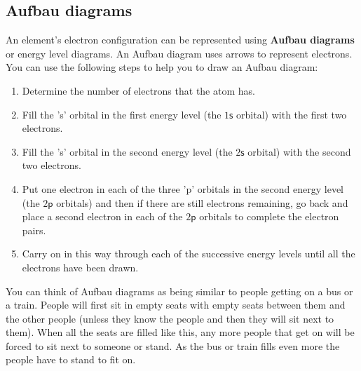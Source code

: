\subsection*{Aufbau diagrams}        
\label{m38741*id259628}An element's electron configuration can be represented using \textbf{Aufbau diagrams} or energy level diagrams. An Aufbau diagram uses arrows to represent electrons. You can use the following steps to help you to draw an Aufbau diagram:\par 
        \label{m38741*id259639}\begin{enumerate}[noitemsep, label=\textbf{\arabic*}. ] 
            \label{m38741*uid96}\item Determine the number of electrons that the atom has.
\label{m38741*uid97}\item Fill the 's' orbital in the first energy level (the $1\mathsf{s}$ orbital) with the first two electrons.
\label{m38741*uid98}\item Fill the 's' orbital in the second energy level (the $2\mathsf{s}$ orbital) with the second two electrons.
\label{m38741*uid99}\item Put one electron in each of the three 'p' orbitals in the second energy level (the $2\mathsf{p}$ orbitals) and then if there are still electrons remaining, go back and place a second electron in each of the $2\mathsf{p}$ orbitals to complete the electron pairs.
\label{m38741*uid100}\item Carry on in this way through each of the successive energy levels until all the electrons have been drawn.
\end{enumerate}

        

\label{m38741*eip-873}You can think of Aufbau diagrams as being similar to people getting on a bus or a train. People will first sit in empty seats with empty seats between them and the other people (unless they know the people and then they will sit next to them). When all the seats are filled like this, any more people that get on will be forced to sit next to someone or stand. As the bus or train fills even more the people have to stand to fit on. \par \label{m38741*id259728}
